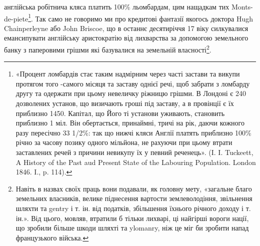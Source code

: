 \parcont{}  %
англійська робітнича кляса платить 100\% льомбардам, цим нащадкам тих Monts-de-piete\footnote{
«Процент ломбардів стає таким надмірним через часті застави та викупи протягом того
-самого місяця та заставу однієї речі, щоб забрати з ломбарду другу та одержати при цьому невеличку
ріжницю грішми. В Лондоні є 240 дозволених установ, що визичають гроші під заставу, а в провінції
є їх приблизно 1450. Капітал, що Його ті установи уживають, становить приблизно 1 міл. Він
обертається,
принаймні, тричі на рік, даючи кожного разу пересічно 33 1/2\%: так що нижчі кляси
Англії платять приблизно 100\% річно за часову позику одного мільйона, не рахуючи при цьому втрати
заставлених речей з причини невикупу їх у певний реченець». (I. I. Tuckeett, A History of the Past
aud Present State of the Labouring Population. London 1846. I., p. 114).
}.
Так само не говоримо ми про кредитові фантазії якогось доктора
Hugh Chainperleyne або John Briscoe, що в останнє десятиріччя 17 віку силкувалися
емансипувати англійську аристократію від лихварства за допомогою
земельного банку з паперовими грішми які базувалися на земельній власності\footnote{
Навіть в назвах своїх праць вони подавали, як головну мету, «загальне благо земельних
власників, велике піднесення вартости землеволодіння, звільнення шляхти та gentry і т. ін. від
податків,
збільшення їхнього річного доходу і т. ін.». Від цього, мовляв, втратили б тільки лихварі, ці
найгірші
вороги нації, що зробили більше шкоди шляхті та ylomanry, ніж це міг би зробити напад французького
війська.
}.

